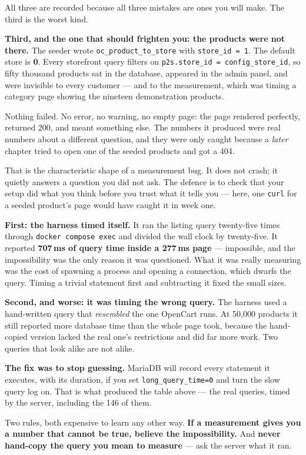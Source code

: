\begin{alertbox}
All three are recorded because all three mistakes are ones you will make. The
third is the worst kind.

\smallskip
\textbf{Third, and the one that should frighten you: the products were not
there.} The seeder wrote \texttt{oc\_product\_to\_store} with
\texttt{store\_id = 1}. The default store is \textbf{0}. Every storefront query
filters on \texttt{p2s.store\_id = config\_store\_id}, so fifty thousand
products sat in the database, appeared in the admin panel, and were invisible
to every customer --- and to the measurement, which was timing a category page
showing the nineteen demonstration products.

\smallskip
Nothing failed. No error, no warning, no empty page: the page rendered
perfectly, returned 200, and meant something else. The numbers it produced were
real numbers about a different question, and they were only caught because a
\emph{later} chapter tried to open one of the seeded products and got a 404.

\smallskip
That is the characteristic shape of a measurement bug. It does not crash; it
quietly answers a question you did not ask. The defence is to check that your
setup did what you think before you trust what it tells you --- here, one
\texttt{curl} for a seeded product's page would have caught it in week one.

\smallskip
\textbf{First: the harness timed itself.} It ran the listing query
twenty-five times through \texttt{docker compose exec} and divided the wall
clock by twenty-five. It reported \textbf{707\,ms of query time inside a
277\,ms page} --- impossible, and the impossibility was the only reason it was
questioned. What it was really measuring was the cost of spawning a process and
opening a connection, which dwarfs the query. Timing a trivial statement first
and subtracting it fixed the small sizes.

\smallskip
\textbf{Second, and worse: it was timing the wrong query.} The harness used a
hand-written query that \emph{resembled} the one OpenCart runs. At 50{,}000
products it still reported more database time than the whole page took, because
the hand-copied version lacked the real one's restrictions and did far more
work. Two queries that look alike are not alike.

\smallskip
\textbf{The fix was to stop guessing.} MariaDB will record every statement it
executes, with its duration, if you set \texttt{long\_query\_time=0} and turn
the slow query log on. That is what produced the table above --- the real
queries, timed by the server, including the 146 of them.

\smallskip
Two rules, both expensive to learn any other way. \textbf{If a measurement
gives you a number that cannot be true, believe the impossibility.} And
\textbf{never hand-copy the query you mean to measure} --- ask the server what
it ran.
\end{alertbox}

